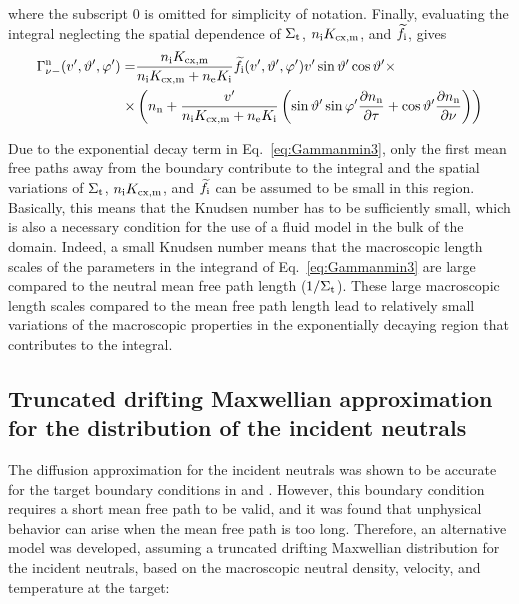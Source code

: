 where the subscript $0$ is omitted for simplicity of notation. Finally, evaluating the integral neglecting the spatial dependence of $\Sigma_{\mathrm{t}}$, $n_{\mathrm{i}} K_{\mathrm{cx,m}}$, and $\widetilde{f}_{\mathrm{i}}$, gives
\begin{align}
\Gamma_{\nu -}^{\mathrm{n}}(v',\vartheta',\varphi') =& \frac{n_{\mathrm{i}} K_{\mathrm{cx,m}}}{n_{\mathrm{i}} K_{\mathrm{cx,m}} + n_{\mathrm{e}} K_{\mathrm{i}}} \widetilde{f}_{\mathrm{i}}(v',\vartheta',\varphi') v' \sin \vartheta' \cos \vartheta' \times \nonumber \\
\times & \left( n_{\mathrm{n}} + \frac{v'}{n_{\mathrm{i}}K_{\mathrm{cx,m}} + n_{\mathrm{e}} K_{\mathrm{i}}} \left( \sin \vartheta' \sin \varphi' \frac{\partial n_{\mathrm{n}}}{\partial \tau} + \cos \vartheta' \frac{\partial n_{\mathrm{n}}}{\partial \nu} \right) \right) \label{eq:Gammanmin}
\end{align}

Due to the exponential decay term in Eq.~\eqref{eq:Gammanmin3}, only the first mean free paths away from the boundary contribute to the integral and the spatial variations of $\Sigma_{\mathrm{t}}$, $n_{\mathrm{i}}K_{\mathrm{cx,m}}$, and $\widetilde{f}_{\mathrm{i}}$ can be assumed to be small in this region. Basically, this means that the Knudsen number has to be sufficiently small, which is also a necessary condition for the use of a fluid model in the bulk of the domain. Indeed, a small Knudsen number means that the macroscopic length scales of the parameters in the integrand of Eq.~\eqref{eq:Gammanmin3} are large compared to the neutral mean free path length ($1/\Sigma_{\mathrm{t}}$). These large macroscopic length scales compared to the mean free path length lead to relatively small variations of the macroscopic properties in the exponentially decaying region that contributes to the integral.

\subsection{Truncated drifting Maxwellian approximation for the distribution of the incident neutrals} \label{sec:maxwellian}

The diffusion approximation for the incident neutrals was shown to be accurate for the target boundary conditions in \cite{nf_niels} and \cite{pet_maarten}. However, this boundary condition requires a short mean free path to be valid, and it was found that unphysical behavior can arise when the mean free path is too long. Therefore, an alternative model was developed, assuming a truncated drifting Maxwellian distribution for the incident neutrals, based on the macroscopic neutral density, velocity, and temperature at the target:

